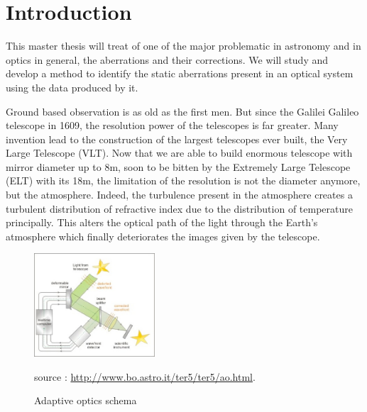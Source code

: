 
\chapter*{Introduction} %
\label{Introduction} %


\newcommand{\keyword}[1]{\textbf{#1}}
\newcommand{\tabhead}[1]{\textbf{#1}}
\newcommand{\code}[1]{\texttt{#1}}
\newcommand{\file}[1]{\texttt{\bfseries#1}}
\newcommand{\option}[1]{\texttt{\itshape#1}}


This master thesis will treat of one of the major problematic in astronomy and in optics in general, the aberrations and their corrections. We will study and develop a method to identify the static aberrations present in an  optical system using the data produced by it.

\vspace{1cm}


Ground based observation is as old as the first men. But since the Galilei Galileo telescope in 1609, the resolution power of the telescopes is far greater. Many invention lead to the construction of the largest telescopes ever built, the Very Large Telescope (VLT). Now that we are able to build enormous telescope with mirror diameter up to 8m, soon to be bitten by the Extremely Large Telescope (ELT) with its 18m, the limitation of the resolution is not the diameter anymore, but the atmosphere. Indeed, the turbulence present in the atmosphere creates a turbulent distribution of refractive index due to the distribution of temperature principally. This alters the optical path of the light through the Earth's atmosphere which finally deteriorates the images given by the telescope.

\begin{figure}
\begin{center}
\includegraphics[width=0.4\textwidth,angle=0]{Figures/ao_scheme.jpg}
\caption{Adaptive optics schema}
source : \url{http://www.bo.astro.it/ter5/ter5/ao.html}.
\label{fig:ao_scheme}
\end{center}
\end{figure}

